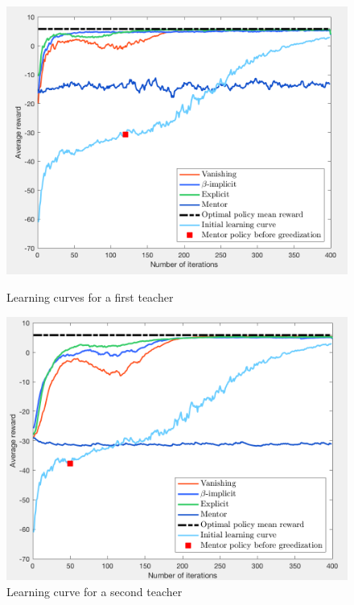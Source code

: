 \documentclass[a4paper]{report}
\begin{document}
{{{{				\begin{figure}[h!]
					\begin{minipage}{0.5\linewidth}
						\includegraphics[width=\linewidth]{fullcomp_subopt_120}
						\caption{Learning curves for a first teacher}
						\label{fig::compliant_comp_120}
					\end{minipage}
					\begin{minipage}{0.5\linewidth}
						\includegraphics[width=\linewidth]{fullcomp_subopt_50}
						\caption{Learning curve for a second teacher}
						\label{fig::compliant_comp_50}
					\end{minipage}
				\end{figure}
				
}}}}
\end{document}

